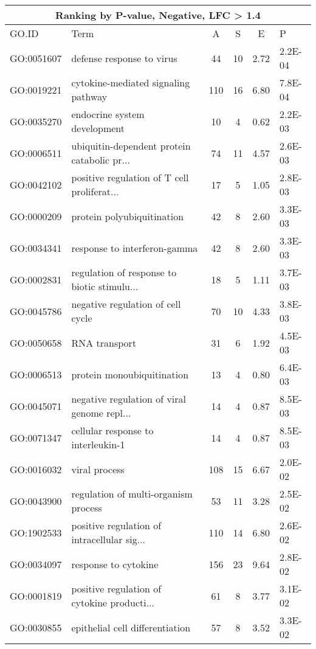\begin{table}[ht]
\centering
\begin{tabular}{llcccl}
\multicolumn{6}{c}{\bf Ranking by P-value, Negative, LFC > 1.4} \\
  \hline
GO.ID & Term & A & S & E & P \\ 
  \hline
GO:0051607 & defense response to virus &  44 &  10 & 2.72 & 2.2E-04 \\ 
  GO:0019221 & cytokine-mediated signaling pathway & 110 &  16 & 6.80 & 7.8E-04 \\ 
  GO:0035270 & endocrine system development &  10 &   4 & 0.62 & 2.2E-03 \\ 
  GO:0006511 & ubiquitin-dependent protein catabolic pr... &  74 &  11 & 4.57 & 2.6E-03 \\ 
  GO:0042102 & positive regulation of T cell proliferat... &  17 &   5 & 1.05 & 2.8E-03 \\ 
  GO:0000209 & protein polyubiquitination &  42 &   8 & 2.60 & 3.3E-03 \\ 
  GO:0034341 & response to interferon-gamma &  42 &   8 & 2.60 & 3.3E-03 \\ 
  GO:0002831 & regulation of response to biotic stimulu... &  18 &   5 & 1.11 & 3.7E-03 \\ 
  GO:0045786 & negative regulation of cell cycle &  70 &  10 & 4.33 & 3.8E-03 \\ 
  GO:0050658 & RNA transport &  31 &   6 & 1.92 & 4.5E-03 \\ 
  GO:0006513 & protein monoubiquitination &  13 &   4 & 0.80 & 6.4E-03 \\ 
  GO:0045071 & negative regulation of viral genome repl... &  14 &   4 & 0.87 & 8.5E-03 \\ 
  GO:0071347 & cellular response to interleukin-1 &  14 &   4 & 0.87 & 8.5E-03 \\ 
  GO:0016032 & viral process & 108 &  15 & 6.67 & 2.0E-02 \\ 
  GO:0043900 & regulation of multi-organism process &  53 &  11 & 3.28 & 2.5E-02 \\ 
  GO:1902533 & positive regulation of intracellular sig... & 110 &  14 & 6.80 & 2.6E-02 \\ 
  GO:0034097 & response to cytokine & 156 &  23 & 9.64 & 2.8E-02 \\ 
  GO:0001819 & positive regulation of cytokine producti... &  61 &   8 & 3.77 & 3.1E-02 \\ 
  GO:0030855 & epithelial cell differentiation &  57 &   8 & 3.52 & 3.3E-02 \\ 

\end{tabular}
\end{table}

